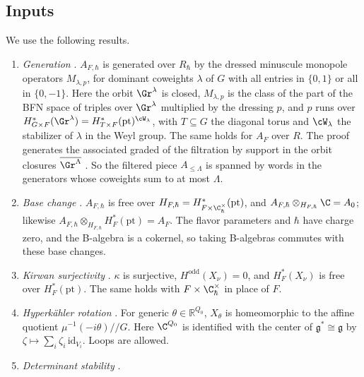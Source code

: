 \documentclass[11pt]{amsart}
\begin{document}
\subsection{Inputs}\label{ss:inputs}
We use the following results.
\begin{enumerate}[leftmargin=2.6em,label=(I\arabic*)]
\item\label{I:gen} \emph{Generation} \cite[Prop.~3.1,
Rem.~3.3]{weekesGeneratorsCoulomb2019}.  $A_{F,\hbar}$ is generated over $R_\hbar$ by the
dressed minuscule monopole operators $M_{\lambda,p}$, for dominant coweights
$\lambda$ of $G$ with all entries in $\{0,1\}$ or all in $\{0,-1\}$.  Here the
orbit $\Gr^\lambda$ is closed, $M_{\lambda,p}$ is the class of the part of
the BFN space of triples over $\Gr^\lambda$ multiplied by the dressing $p$, and
$p$ runs over $H^*_{G\times F}(\Gr^\lambda)=H^*_{T\times F}(\mathrm{pt})^{\cW_\lambda}$,
with $T\subseteq G$ the diagonal torus and $\cW_\lambda$ the stabilizer of
$\lambda$ in the Weyl group.  The same holds for $A_F$ over $R$.  The proof generates the associated graded of the
filtration by support in the orbit closures $\overline{\Gr^\Lambda}$
\cite[Prop.~6.8]{BFN}.  So the filtered piece $A_{\le\Lambda}$ is spanned
by words in the generators whose coweights sum to at most $\Lambda$.
\item\label{I:base} \emph{Base change} \cite[Prop.~3.22]{BFN}.
$A_{F,\hbar}$ is free over $H_{F,\hbar}=H^*_{F\times\C^\times_\hbar}(\mathrm{pt})$,
and $A_{F,\hbar}\otimes_{H_{F,\hbar}}\C=A_0$; likewise
$A_{F,\hbar}\otimes_{H_{F,\hbar}}H^*_F(\mathrm{pt})=A_F$.  The flavor parameters
and $\hbar$ have charge zero, and the B-algebra is a cokernel, so taking
B-algebras commutes with these base changes.
\item\label{I:kirwan} \emph{Kirwan surjectivity} \cite[Thm.~1.2,
Cor.~1.5]{mcgertyKirwanSurjectivity2018}.  $\kappa$ is surjective, $H^{\mathrm{odd}}(X_\nu)=0$, and
$H^*_F(X_\nu)$ is free over $H^*_F(\mathrm{pt})$.  The same holds with
$F\times\C^\times_\hbar$ in place of $F$.
\item\label{I:rot} \emph{Hyperk\"ahler rotation} \cite[Prop.~3.18]{bellamySymplecticResolutions2021}.
For generic $\theta\in\mathbb R^{Q_0}$, $X_\theta$ is homeomorphic to the
affine quotient $\mu^{-1}(-i\theta)/\!/G$.  Here $\C^{Q_0}$ is identified with
the center of $\mathfrak g^*\cong\mathfrak g$ by $\zeta\mapsto\sum_i\zeta_i\,\mathrm{id}_{V_i}$.  Loops are allowed.
\item\label{I:cyc} \emph{Determinant stability} \cite[Lemma~7.1]{hilburnBFNSpringer2023}.

\end{enumerate}
\end{document}
